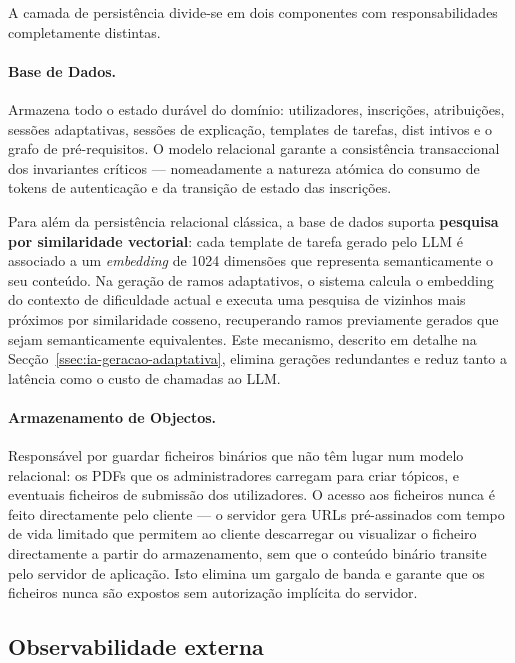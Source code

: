 A camada de persist\^encia divide-se em dois componentes com responsabilidades
completamente distintas.

\paragraph{Base de Dados.}
Armazena todo o estado dur\'avel do dom\'inio: utilizadores, inscri\c{c}\~oes,
atribui\c{c}\~oes, sess\~oes adaptativas, sess\~oes de explica\c{c}\~ao,
templates de tarefas, dist intivos e o grafo de pr\'e-requisitos. O modelo
relacional garante a consist\^encia transaccional dos invariantes cr\'iticos
--- nomeadamente a natureza at\'omica do consumo de tokens de
autentica\c{c}\~ao e da transi\c{c}\~ao de estado das inscri\c{c}\~oes.

Para al\'em da persist\^encia relacional cl\'assica, a base de dados suporta
\textbf{pesquisa por similaridade vectorial}: cada template de tarefa gerado
pelo LLM \'e associado a um \emph{embedding} de 1024 dimens\~oes que
representa semanticamente o seu conte\'udo. Na gera\c{c}\~ao de ramos
adaptativos, o sistema calcula o embedding do contexto de dificuldade actual
e executa uma pesquisa de vizinhos mais pr\'oximos por similaridade cosseno,
recuperando ramos previamente gerados que sejam semanticamente equivalentes.
Este mecanismo, descrito em detalhe na Sec\c{c}\~ao~\ref{ssec:ia-geracao-adaptativa},
elimina gera\c{c}\~oes redundantes e reduz tanto a lat\^encia como o custo
de chamadas ao LLM.

\paragraph{Armazenamento de Objectos.}
Respons\'avel por guardar ficheiros bin\'arios que n\~ao t\^em lugar num
modelo relacional: os PDFs que os administradores carregam para criar
t\'opicos, e eventuais ficheiros de submiss\~ao dos utilizadores. O acesso
aos ficheiros nunca \'e feito directamente pelo cliente --- o servidor gera
URLs pr\'e-assinados com tempo de vida limitado que permitem ao cliente
descarregar ou visualizar o ficheiro directamente a partir do armazenamento,
sem que o conte\'udo bin\'ario transite pelo servidor de aplica\c{c}\~ao.
Isto elimina um gargalo de banda e garante que os ficheiros nunca s\~ao
expostos sem autoriza\c{c}\~ao impl\'icita do servidor.

\subsection{Observabilidade externa}
\label{ssec:observabilidade}

